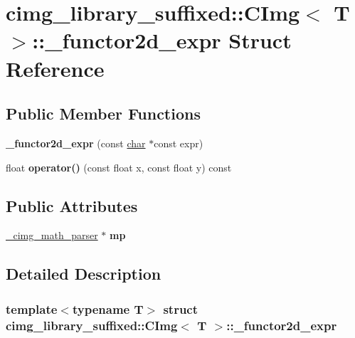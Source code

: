 \hypertarget{structcimg__library__suffixed_1_1CImg_1_1__functor2d__expr}{}\section{cimg\+\_\+library\+\_\+suffixed\+:\+:C\+Img$<$ T $>$\+:\+:\+\_\+functor2d\+\_\+expr Struct Reference}
\label{structcimg__library__suffixed_1_1CImg_1_1__functor2d__expr}
\subsection*{Public Member Functions}
\begin{DoxyCompactItemize}
\item 
\mbox{\label{structcimg__library__suffixed_1_1CImg_1_1__functor2d__expr_a281d2130c226e23e6f3f2491d8ff60b3}} 
{\bfseries \+\_\+functor2d\+\_\+expr} (const \hyperlink{classchar}{char} $\ast$const expr)
\item 
\mbox{\label{structcimg__library__suffixed_1_1CImg_1_1__functor2d__expr_ae7f97b320d95d5c03e58696b08fafc52}} 
float {\bfseries operator()} (const float x, const float y) const
\end{DoxyCompactItemize}
\subsection*{Public Attributes}
\begin{DoxyCompactItemize}
\item 
\mbox{\label{structcimg__library__suffixed_1_1CImg_1_1__functor2d__expr_a326bbd383e5bdaf8c37bfa3cfdf16442}} 
\hyperlink{structcimg__library__suffixed_1_1CImg_1_1__cimg__math__parser}{\+\_\+cimg\+\_\+math\+\_\+parser} $\ast$ {\bfseries mp}
\end{DoxyCompactItemize}


\subsection{Detailed Description}
\subsubsection*{template$<$typename T$>$\newline
struct cimg\+\_\+library\+\_\+suffixed\+::\+C\+Img$<$ T $>$\+::\+\_\+functor2d\+\_\+expr}



